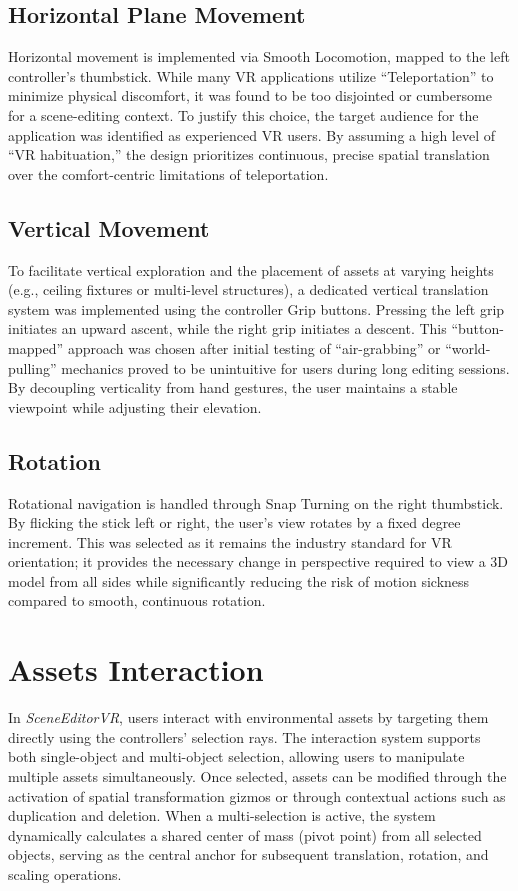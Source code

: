 \documentclass[inscr,ack,preface]{dithesis}
\begin{document}
\subsection{Horizontal Plane Movement}
Horizontal movement is implemented via Smooth Locomotion, mapped to the left controller’s thumbstick. While many VR applications
utilize ``Teleportation'' to minimize physical discomfort, it was found to be too disjointed or cumbersome for a scene-editing
context. To justify this choice, the target audience for the application was identified as
experienced VR users. By assuming a high level of ``VR habituation,'' the design prioritizes continuous, precise spatial translation
over the comfort-centric limitations of teleportation.

\subsection{Vertical Movement}
To facilitate vertical exploration and the placement of assets at varying heights (e.g., ceiling fixtures or multi-level structures),
a dedicated vertical translation system was implemented using the controller Grip buttons. Pressing the left grip initiates an upward ascent,
while the right grip initiates a descent. This ``button-mapped'' approach was chosen after initial testing of ``air-grabbing'' or ``world-pulling''
mechanics proved to be unintuitive for users during long editing sessions. By decoupling verticality from hand gestures, the user maintains
a stable viewpoint while adjusting their elevation.

\subsection{Rotation}
Rotational navigation is handled through Snap Turning on the right thumbstick. By flicking the stick left or right, the user’s view
rotates by a fixed degree increment. This was selected as it remains the industry standard for VR orientation; it provides the necessary
change in perspective required to view a 3D model from all sides while significantly reducing the risk of motion sickness
compared to smooth, continuous rotation.
\section{Assets Interaction}
In \textit{SceneEditorVR}, users interact with environmental assets by targeting them directly using the controllers' selection rays. The interaction system supports both single-object and multi-object selection, allowing users to manipulate multiple assets simultaneously. Once selected, assets can be modified through the activation of spatial transformation gizmos or through contextual actions such as duplication and deletion. When a multi-selection is active, the system dynamically calculates a shared center of mass (pivot point) from all selected objects, serving as the central anchor for subsequent translation, rotation, and scaling operations.
\end{document}
